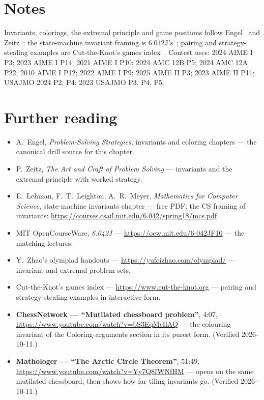 \section*{Notes}
Invariants, colorings, the extremal principle and game positions follow
Engel~\cite{engel} and Zeitz~\cite{zeitz}; the state-machine
invariant framing is 6.042J's~\cite{mcs}; pairing and
strategy-stealing examples are Cut-the-Knot's games
index~\cite{cuttheknot}. Contest uses: 2024 AIME I P3; 2023 AIME I P14;
2021 AIME I P10; 2024 AMC 12B P5; 2024 AMC 12A P22; 2010 AIME I P12;
2022 AIME I P9; 2025 AIME II P3; 2023 AIME II P11; USAJMO 2024 P2, P4;
2023 USAJMO P3, P4, P5.

\section*{Further reading}
\begin{itemize}
\item A.~Engel, \emph{Problem-Solving Strategies}, invariants and
coloring chapters --- the canonical drill source for this chapter.
\item P.~Zeitz, \emph{The Art and Craft of Problem Solving} ---
invariants and the extremal principle with worked strategy.
\item E.~Lehman, F.~T.~Leighton, A.~R.~Meyer, \emph{Mathematics for
Computer Science}, state-machine invariants chapter --- free PDF; the
CS framing of invariants:
\url{https://courses.csail.mit.edu/6.042/spring18/mcs.pdf}
\item MIT OpenCourseWare, \emph{6.042J} ---
\url{https://ocw.mit.edu/6-042JF10} --- the matching lectures.
\item Y.~Zhao's olympiad handouts ---
\url{https://yufeizhao.com/olympiad/} --- invariant and extremal
problem sets.
\item Cut-the-Knot's games index ---
\url{https://www.cut-the-knot.org} --- pairing and strategy-stealing
examples in interactive form.
\end{itemize}

\begin{rulebox}
\begin{itemize}
\item \textbf{ChessNetwork --- ``Mutilated chessboard problem''},
4:07, \url{https://www.youtube.com/watch?v=bS3EqMcIlAQ} --- the
colouring invariant of the Coloring-arguments section in its purest
form. (Verified 2026-10-11.)
\item \textbf{Mathologer --- ``The Arctic Circle Theorem''}, 51:49,
\url{https://www.youtube.com/watch?v=Yy7Q8IWNfHM} --- opens on the same
mutilated chessboard, then shows how far tiling invariants go.
(Verified 2026-10-11.)
\end{itemize}
\end{rulebox}

\chapternotes
